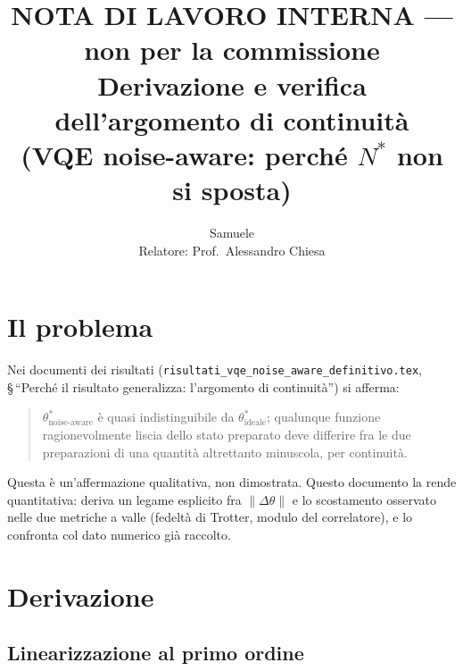 \documentclass[11pt,a4paper]{article}
\title{NOTA DI LAVORO INTERNA --- non per la commissione\\
\large Derivazione e verifica dell'argomento di continuità\\
\large(VQE noise-aware: perché $N^*$ non si sposta)}
\author{Samuele \\ Relatore: Prof.\ Alessandro Chiesa}
\date{}
\begin{document}
\maketitle

\begin{center}
\end{center}

\tableofcontents

\section{Il problema}

Nei documenti dei risultati (\texttt{risultati\_vqe\_noise\_aware\_definitivo.tex},
§\,``Perché il risultato generalizza: l'argomento di continuità'') si afferma:

\begin{quote}
$\theta^*_\text{noise-aware}$ è quasi indistinguibile da
$\theta^*_\text{ideale}$; qualunque funzione ragionevolmente liscia dello
stato preparato deve differire fra le due preparazioni di una quantità
altrettanto minuscola, per continuità.
\end{quote}

Questa è un'affermazione qualitativa, non dimostrata. Questo documento la
rende quantitativa: deriva un legame esplicito fra $\|\Delta\theta\|$ e lo
scostamento osservato nelle due metriche a valle (fedeltà di Trotter,
modulo del correlatore), e lo confronta col dato numerico già raccolto.

\section{Derivazione}

\subsection{Linearizzazione al primo ordine}
\end{document}
